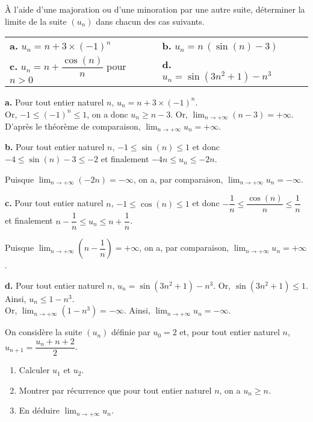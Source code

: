 \documentclass[11pt,fleqn, openany]{book} %
\begin{document}
\begin{exercise}À l'aide d'une majoration ou d'une minoration par une autre suite, déterminer la limite de la suite $(u_n)$ dans chacun des cas suivants.
\renewcommand{\arraystretch}{2.2}
\begin{center}
\begin{tabularx}{\linewidth}{XXXX}
\textbf{a.} $ u_n = n+3\times (-1)^n$ & \textbf{b.} $ u_n=n\,(\sin(n)-3)$ \\
\textbf{c.} $ u_n = n+\dfrac{\cos(n)}{n}$ pour $n>0$ & \textbf{d.} $u_n=\sin(3n^2+1)-n^3$ \\
\end{tabularx}
\end{center}\end{exercise}

\begin{solution}\textbf{a.} Pour tout entier naturel $n$, $u_n=n+3\times (-1)^n$.\\ Or, $-1 \leqslant (-1)^n \leqslant 1$, on a donc $u_n \geqslant n-3$. Or, $\displaystyle \lim_{n\to + \infty}(n-3) = +\infty$. D'après le théorème de comparaison, $\displaystyle \lim_{n\to + \infty} u_n = +\infty$.

\textbf{b.} Pour tout entier naturel $n$, $-1 \leqslant \sin(n) \leqslant 1$ et donc $-4 \leqslant \sin(n)-3 \leqslant -2$ et finalement $-4n \leqslant u_n \leqslant -2n$.

Puisque $\displaystyle\lim_{n \to + \infty} (-2n)=-\infty$, on a, par comparaison, $\displaystyle\lim_{n \to + \infty}u_n=-\infty$.

\textbf{c.} Pour tout entier naturel $n$, $-1 \leqslant \cos(n) \leqslant 1$ et donc $-\dfrac{1}{n} \leqslant \dfrac{\cos(n)}{n} \leqslant \dfrac{1}{n}$ et finalement $n-\dfrac{1}{n} \leqslant u_n \leqslant n+\dfrac{1}{n}$.

Puisque $\displaystyle\lim_{n \to + \infty} \left(n-\dfrac{1}{n}\right)=+\infty$, on a, par comparaison, $\displaystyle\lim_{n \to + \infty}u_n=+\infty$.

\textbf{d.} Pour tout entier naturel $n$, $u_n=\sin (3n^2+1)-n^3$. Or, $\sin (3n^2+1) \leqslant 1$. Ainsi, $u_n \leqslant 1-n^3$. \\Or, $\displaystyle \lim_{n \to +\infty} (1-n^3)=-\infty$. Ainsi, $\displaystyle \lim_{n \to +\infty} u_n = -\infty$.

\end{solution}


\begin{exercise}On considère la suite $(u_n)$ définie par $u_0=2$ et, pour tout entier naturel $n$, $u_{n+1}=\dfrac{u_n+n+2}{2}$.
\begin{enumerate}
\item Calculer $u_1$ et $u_2$.
\item Montrer par récurrence que pour tout entier naturel $n$, on a $u_n\geqslant n$.
\item En déduire $\displaystyle\lim_{n \to +\infty}u_n$.
\end{enumerate}\end{exercise}
\end{document}
